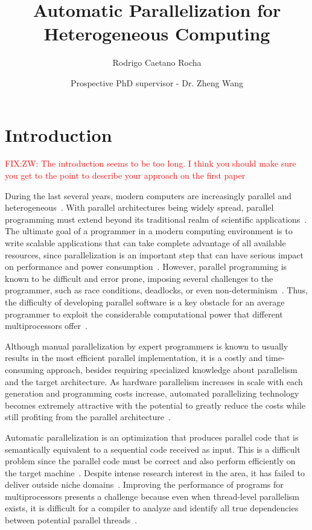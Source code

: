 \documentclass[a4paper,12pt]{article}
\title{\textbf{Automatic Parallelization for Heterogeneous Computing}}
\date{Prospective PhD supervisor - Dr. Zheng Wang}
\author[]{Rodrigo Caetano Rocha}
\newcommand\FIXME[1]{\textcolor{red}{FIX:}\textcolor{red}{#1}}
\begin{document}
\maketitle

\begin{abstract}

\end{abstract}

\section{Introduction} 

\FIXME{ZW: The introduction seems to be too long. I think you should make sure you get to the point to describe your approach on the first paper}

During the last several years, modern computers are increasingly parallel and
heterogeneous~\cite{mohanty12,misailovic13}.  With parallel architectures being
widely spread, parallel programming must extend beyond its traditional realm of
scientific applications~\cite{li09}.  The ultimate goal of a programmer in a
modern computing environment is to write scalable applications that can take
complete advantage of all available resources, since parallelization is an
important step that can have serious impact on performance and
power consumption~\cite{cockx10}.  However, parallel programming is known to be difficult
and error prone, imposing several challenges to the programmer, such as race
conditions, deadlocks, or even
non-determinism~\cite{cockx10,mccool10,mccool12}.  Thus, the difficulty of
developing parallel software is a key obstacle for an average programmer to
exploit the considerable computational power that different multiprocessors
offer~\cite{misailovic13}.

Although manual parallelization by expert programmers is known to usually
results in the most efficient parallel implementation, it is a costly and
time-consuming approach, besides requiring specialized knowledge about
parallelism and the target architecture.  As hardware parallelism increases in
scale with each generation and programming costs increase, automated
parallelizing technology becomes extremely attractive with the potential to
greatly reduce the costs while still profiting from the parallel
architecture~\cite{tournavitis09,wang14a}.

Automatic parallelization is an optimization that produces parallel code that
is semantically equivalent to a sequential code received as input.  This is a
difficult problem since the parallel code must be correct and also perform
efficiently on the target machine~\cite{williams99}.  Despite intense research
interest in the area, it has failed to deliver outside niche
domains~\cite{tournavitis09,wang14a}.  Improving the performance of programs
for multiprocessors presents a challenge because even when thread-level
parallelism exists, it is difficult for a compiler to analyze and identify all
true dependencies between potential parallel threads~\cite{hammond98}.
\end{document}
